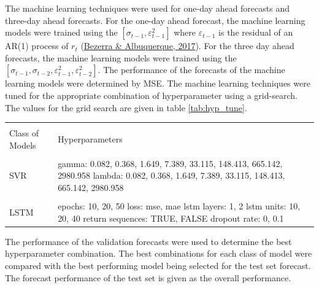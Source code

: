 \documentclass[11pt,preprint, authoryear]{elsarticle}
\let\origtable\table
\let\endorigtable\endtable
\renewenvironment{table}[1][2] {
    \expandafter\origtable\expandafter[H]
} {
    \endorigtable
}
\numberwithin{equation}{section}
\numberwithin{figure}{section}
\numberwithin{table}{section}
\begin{document}
\par

The machine learning techniques were used for one-day ahead forecasts
and three-day ahead forecasts. For the one-day ahead forecast, the
machine learning models were trained using the
\([\sigma_{t-1}, \varepsilon_{t-1}^2]\) where \(\varepsilon_{t-1}\) is
the residual of an AR(1) process of \(r_t\)
(\protect\hyperlink{ref-svr-garch-2}{Bezerra \& Albuquerque, 2017}). For
the three day ahead forecasts, the machine learning models were trained
using the
\([\sigma_{t-1}, \sigma_{t-2}, \varepsilon_{t-1}^2, \varepsilon_{t-2}^2]\).
The performance of the forecasts of the machine learning models were
determined by MSE. The machine learning techniques were tuned for the
appropriate combination of hyperparameter using a grid-search. The
values for the grid search are given in table \ref{tab:hyp_tune}.

\begin{table}[ht]
    \centering
    \caption{Hyperparameter tuning grid}
    \begin{tabular}{lp{80mm}}
       \\[-1.8ex] \hline
\hline \\[-1.8ex] 
    Class of Models & Hyperparameters \\
    \hline \\[-1.8ex] 
        SVR & gamma: 0.082, 0.368, 1.649, 7.389, 33.115, 148.413, 665.142, 2980.958 \newline 
        lambda: 0.082, 0.368, 1.649, 7.389, 33.115, 148.413, 665.142, 2980.958 \\
        \hline \\[-1.8ex] 
        LSTM & epochs: 10, 20, 50 \newline
        loss: mse, mae \newline
                        lstm layers: 1, 2 \newline
                        lstm units: 10, 20, 40 \newline
                        return sequences: TRUE, FALSE \newline
                        dropout rate: 0, 0.1 \\
                        \hline
    \end{tabular}
    \label{tab:hyp_tune}
\end{table}

The performance of the validation forecasts were used to determine the
best hyperparameter combination. The best combinations for each class of
model were compared with the best performing model being selected for
the test set forecast. The forecast performance of the test set is given
as the overall performance.
\end{document}
